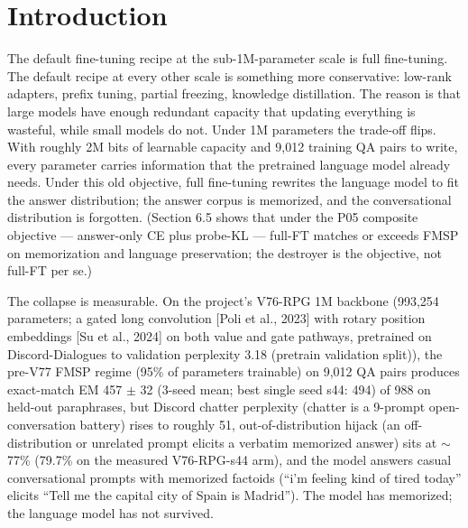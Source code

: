 \documentclass[11pt]{article}
\begin{document}
\section{Introduction}

The default fine-tuning recipe at the sub-1M-parameter scale is full fine-tuning. The default recipe at every other scale is something more conservative: low-rank adapters, prefix tuning, partial freezing, knowledge distillation. The reason is that large models have enough redundant capacity that updating everything is wasteful, while small models do not. Under 1M parameters the trade-off flips. With roughly 2M bits of learnable capacity and 9{,}012 training QA pairs to write, every parameter carries information that the pretrained language model already needs. Under this old objective, full fine-tuning rewrites the language model to fit the answer distribution; the answer corpus is memorized, and the conversational distribution is forgotten. (Section 6.5 shows that under the P05 composite objective --- answer-only CE plus probe-KL --- full-FT matches or exceeds FMSP on memorization and language preservation; the destroyer is the objective, not full-FT per se.)

The collapse is measurable. On the project's V76-RPG 1M backbone (993{,}254 parameters; a gated long convolution [Poli et al., 2023] with rotary position embeddings [Su et al., 2024] on both value and gate pathways, pretrained on Discord-Dialogues to validation perplexity 3.18 (pretrain validation split)), the pre-V77 FMSP regime (95\% of parameters trainable) on 9{,}012 QA pairs produces exact-match EM 457 $\pm$ 32 (3-seed mean; best single seed s44: 494) of 988 on held-out paraphrases, but Discord chatter perplexity (chatter is a 9-prompt open-conversation battery) rises to roughly 51, out-of-distribution hijack (an off-distribution or unrelated prompt elicits a verbatim memorized answer) sits at $\sim$77\% (79.7\% on the measured V76-RPG-s44 arm), and the model answers casual conversational prompts with memorized factoids (``i'm feeling kind of tired today'' elicits ``Tell me the capital city of Spain is Madrid''). The model has memorized; the language model has not survived.
\end{document}
